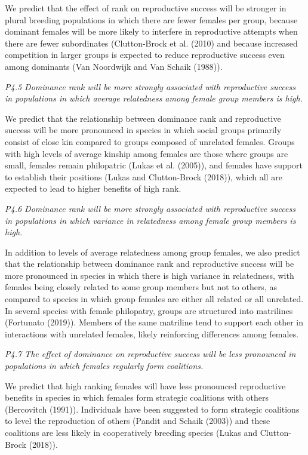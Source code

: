 \documentclass[]{article}
\begin{document}
We predict that the effect of rank on reproductive success will be
stronger in plural breeding populations in which there are fewer females
per group, because dominant females will be more likely to interfere in
reproductive attempts when there are fewer subordinates (Clutton-Brock
et al. (2010) and because increased competition in larger groups is
expected to reduce reproductive success even among dominants (Van
Noordwijk and Van Schaik (1988)).

\emph{P4.5 Dominance rank will be more strongly associated with
reproductive success in populations in which average relatedness among
female group members is high.}

We predict that the relationship between dominance rank and reproductive
success will be more pronounced in species in which social groups
primarily consist of close kin compared to groups composed of unrelated
females. Groups with high levels of average kinship among females are
those where groups are small, females remain philopatric (Lukas et al.
(2005)), and females have support to establish their positions (Lukas
and Clutton-Brock (2018)), which all are expected to lead to higher
benefits of high rank.

\emph{P4.6 Dominance rank will be more strongly associated with
reproductive success in populations in which variance in relatedness
among female group members is high.}

In addition to levels of average relatedness among group females, we
also predict that the relationship between dominance rank and
reproductive success will be more pronounced in species in which there
is high variance in relatedness, with females being closely related to
some group members but not to others, as compared to species in which
group females are either all related or all unrelated. In several
species with female philopatry, groups are structured into matrilines
(Fortunato (2019)). Members of the same matriline tend to support each
other in interactions with unrelated females, likely reinforcing
differences among females.

\emph{P4.7 The effect of dominance on reproductive success will be less
pronounced in populations in which females regularly form coalitions.}

We predict that high ranking females will have less pronounced
reproductive benefits in species in which females form strategic
coalitions with others (Bercovitch (1991)). Individuals have been
suggested to form strategic coalitions to level the reproduction of
others (Pandit and Schaik (2003)) and these coalitions are less likely
in cooperatively breeding species (Lukas and Clutton-Brock (2018)).
\end{document}
